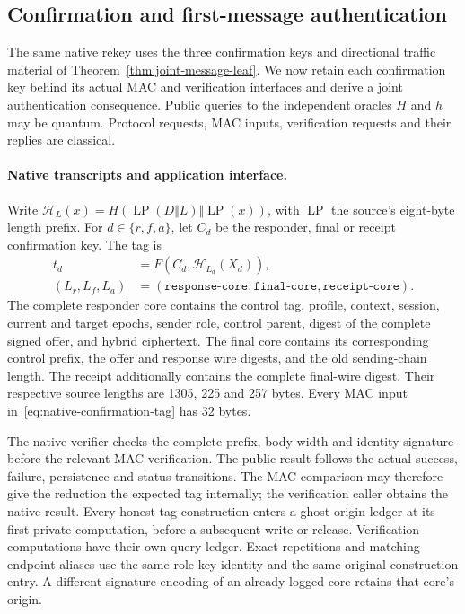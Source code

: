 \subsection{Confirmation and first-message authentication}
\label{sec:confirmation-traffic}

The same native rekey uses the three confirmation keys and directional
traffic material of Theorem~\ref{thm:joint-message-leaf}. We now retain
each confirmation key behind its actual MAC and verification interfaces
and derive a joint authentication consequence. Public queries to the
independent oracles $H$ and $h$ may be quantum. Protocol requests, MAC
inputs, verification requests and their replies are classical.

\paragraph{Native transcripts and application interface.}
Write $\mathcal H_L(x)=H(\operatorname{LP}(D\Vert L)
\Vert\operatorname{LP}(x))$, with $\operatorname{LP}$ the source's
eight-byte length prefix. For $d\in\{r,f,a\}$, let $C_d$ be the responder,
final or receipt confirmation key. The tag is
\begin{equation}
\begin{aligned}
 t_d&=F(C_d,\mathcal H_{L_d}(X_d)),\\
 (L_r,L_f,L_a)&=(\texttt{response-core},\texttt{final-core},
                         \texttt{receipt-core}).
\end{aligned}
\label{eq:native-confirmation-tag}
\end{equation}
The complete responder core contains the control tag, profile, context,
session, current and target epochs, sender role, control parent, digest of
the complete signed offer, and hybrid ciphertext. The final core contains
its corresponding control prefix, the offer and response wire digests,
and the old sending-chain length. The receipt additionally contains the
complete final-wire digest. Their respective source lengths are 1305,
225 and 257 bytes. Every MAC input in~\eqref{eq:native-confirmation-tag}
has 32 bytes.

The native verifier checks the complete prefix, body width and identity
signature before the relevant MAC verification. The public result follows
the actual success, failure, persistence and status transitions. The MAC
comparison may therefore give the reduction the expected tag internally;
the verification caller obtains the native result. Every honest tag
construction enters a ghost origin ledger at its first private
computation, before a subsequent write or release. Verification
computations have their own query ledger. Exact repetitions and matching
endpoint aliases use the same role-key identity and the same original
construction entry. A different signature encoding of an already logged
core retains that core's origin.

